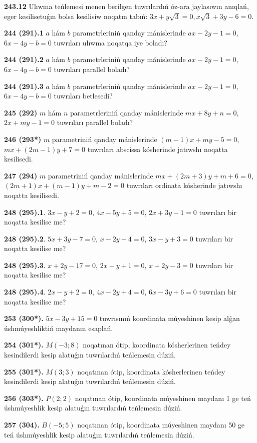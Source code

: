 \documentclass{article}
\begin{document}
\textbf{243.12} Ulıwma teńlemesi menen berilgen tuwrılardıń
óz-ara jaylasıwın anıqlań, eger kesilisetuǵın bolsa kesilisiw noqatın
tabıń: $3x+y\sqrt{3}=0, x\sqrt{3}+3y-6=0$.

\textbf{244 (291).1} $a$ hám $b$ parametrleriniń qanday mánislerinde
$ax-2y-1=0$, $6x-4y-b=0$ tuwrıları ulıwma noqatqa iye boladı?

\textbf{244 (291).2} $a$ hám $b$ parametrleriniń qanday mánislerinde
$ax-2y-1=0$, $6x-4y-b=0$ tuwrıları parallel boladı?

\textbf{244 (291).3} $a$ hám $b$ parametrleriniń qanday mánislerinde
$ax-2y-1=0$, $6x-4y-b=0$ tuwrıları betlesedi?

\textbf{245 (292)} $m$ hám $n$ parametrleriniń qanday mánislerinde
$mx+8y+n=0$, $2x+my-1=0$ tuwrıları parallel boladı?

\textbf{246 (293*)} $m$ parametriniń qanday mánislerinde 
$(m-1)x+my-5=0$, $mx+(2m-1)y+7=0$ tuwrıları abscissa
kósherinde jatıwshı noqatta kesilisedi.

\textbf{247 (294)} $m$ parametriniń qanday mánislerinde 
$mx+(2m+3)y+m+6=0$, $(2m+1)x+(m-1)y+m-2=0$ tuwrıları ordinata
kósherinde jatıwshı noqatta kesilisedi.

\textbf{248 (295).1}. $3x-y+2=0$, $4x-5y+5=0$, $2x+3y-1=0$ 
tuwrıları bir noqatta kesilise me?

\textbf{248 (295).2}. $5x+3y-7=0$, $x-2y-4=0$, $3x-y+3=0$ 
tuwrıları bir noqatta kesilise me?

\textbf{248 (295).3}. $x+2y-17=0$, $2x-y+1=0$, $x+2y-3=0$ 
tuwrıları bir noqatta kesilise me?

\textbf{248 (295).4}. $2x-y+2=0$, $4x-2y+4=0$, $6x-3y+6=0$ 
tuwrıları bir noqatta kesilise me?

\textbf{253 (300*).} $5x-3y+15=0$ tuwrısınıń koordinata múyeshinen
kesip alǵan úshmúyeshliktiń maydanın esaplań.

\textbf{254 (301*).} $M(-3;8)$ noqatınan ótip, koordinata kósherlerinen
teńdey kesindilerdi kesip alatuǵın tuwrılardıń teńlemesin dúziń.

\textbf{255 (301*).} $M(3;3)$ noqatınan ótip, koordinata kósherlerinen teńdey
kesindilerdi kesip alatuǵın tuwrılardıń teńlemesin dúziń.

\textbf{256 (303*).} $P(2;2)$ noqatınan ótip, koordinata múyeshinen 
maydanı 1 ge teń úshmúyeshlik kesip alatuǵın tuwrılardıń 
teńlemesin dúziń.

\textbf{257 (304).} $B(-5;5)$ noqatınan ótip, koordinata múyeshinen
maydanı 50 ge teń úshmúyeshlik kesip alatuǵın tuwrılardıń teńlemesin
dúziń.
\end{document}
